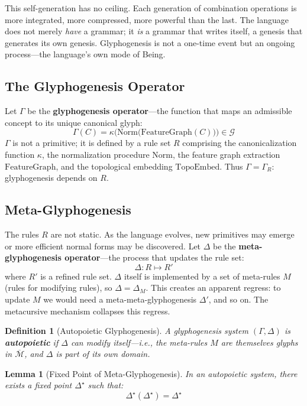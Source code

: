 \documentclass[12pt, letterpaper]{book}
\newtheorem{lemma}[theorem]{Lemma}
\newtheorem{definition}{Definition}[chapter]
\begin{document}
This self-generation has no ceiling. Each generation of combination operations is more integrated, more compressed, more powerful than the last. The language does not merely \textit{have} a grammar; it \textit{is} a grammar that writes itself, a genesis that generates its own genesis. Glyphogenesis is not a one-time event but an ongoing process---the language's own mode of Being.

\subsection{The Glyphogenesis Operator}

Let $\Gamma$ be the \textbf{glyphogenesis operator}---the function that maps an admissible concept to its unique canonical glyph:
\[
\Gamma(C) = \kappa\big(\mathrm{Norm}\big(\mathrm{FeatureGraph}(C)\big)\big) \in \mathcal{G}
\]
$\Gamma$ is not a primitive; it is defined by a rule set $R$ comprising the canonicalization function $\kappa$, the normalization procedure $\mathrm{Norm}$, the feature graph extraction $\mathrm{FeatureGraph}$, and the topological embedding $\mathrm{TopoEmbed}$. Thus $\Gamma = \Gamma_R$: glyphogenesis depends on $R$.

\subsection{Meta-Glyphogenesis}

The rules $R$ are not static. As the language evolves, new primitives may emerge or more efficient normal forms may be discovered. Let $\Delta$ be the \textbf{meta-glyphogenesis operator}---the process that updates the rule set:
\[
\Delta: R \mapsto R'
\]
where $R'$ is a refined rule set. $\Delta$ itself is implemented by a set of meta-rules $M$ (rules for modifying rules), so $\Delta = \Delta_M$. This creates an apparent regress: to update $M$ we would need a meta-meta-glyphogenesis $\Delta'$, and so on. The metacursive mechanism collapses this regress.

\begin{definition}[Autopoietic Glyphogenesis]\label{def:autopoietic-glyph}
A glyphogenesis system $(\Gamma, \Delta)$ is \textbf{autopoietic} if $\Delta$ can modify itself---i.e., the meta-rules $M$ are themselves glyphs in $\overline{\mathcal{M}}$, and $\Delta$ is part of its own domain.
\end{definition}

\begin{lemma}[Fixed Point of Meta-Glyphogenesis]\label{lem:delta-fixpoint}
In an autopoietic system, there exists a fixed point $\Delta^\star$ such that:
\[
\Delta^\star(\Delta^\star) = \Delta^\star
\]
\end{lemma}
\end{document}
